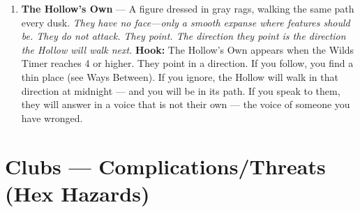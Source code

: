 \begin{enumerate}
\item[A] \textbf{The Hollow's Own} --- A figure dressed in gray rags, walking the same path every dusk.
  \hfill \textit{They have no face---only a smooth expanse where features should be. They do not attack. They point. The direction they point is the direction the Hollow will walk next.}
  \textbf{Hook:} The Hollow's Own appears when the Wilds Timer reaches 4 or higher. They point in a direction. If you follow, you find a thin place (see Ways Between). If you ignore, the Hollow will walk in that direction at midnight --- and you will be in its path. If you speak to them, they will answer in a voice that is not their own --- the voice of someone you have wronged.
\end{enumerate}

\section*{Clubs --- Complications/Threats (Hex Hazards)}
\label{sec:wilderness-complications}
